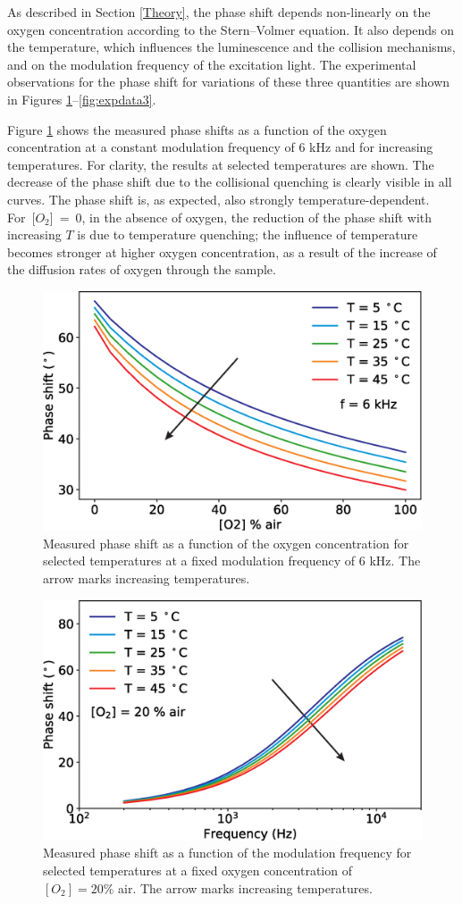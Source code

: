 \documentclass[sensors,article,accept,moreauthors,pdftex,10pt,a4paper]{Definitions/mdpi}
\begin{document}
As described in Section \ref{Theory}, the phase shift depends non-linearly on the oxygen concentration according to the Stern--Volmer equation. It also depends on the temperature, which influences the luminescence and the collision mechanisms, and on the modulation frequency of the excitation light. The experimental observations for the phase shift for variations of these three quantities are shown in Figures \ref{fig:expdata1}--\ref{fig:expdata3}.

Figure \ref{fig:expdata1} shows the measured phase shifts as a function of the oxygen concentration at a constant modulation frequency of 6 kHz and for increasing temperatures. For clarity, the results at selected temperatures are shown. The decrease of the phase shift due to the collisional quenching is clearly visible in all curves. The phase shift is, as expected, also strongly temperature-dependent. \mbox{For [$O_2$] = 0}, in the absence of oxygen, the reduction of the phase shift with increasing $T$ is due to temperature quenching; the influence of temperature becomes stronger at higher oxygen concentration, as a result of the increase of the diffusion rates of oxygen through the sample.

\begin{figure}[H]
\centering
\includegraphics[width=9 cm]{phase_O2_T.eps}
\caption{Measured phase shift as a function of the oxygen concentration for selected temperatures at a fixed modulation frequency of 6 kHz. The arrow marks increasing temperatures.}
\label{fig:expdata1}
\end{figure}
\unskip


\begin{figure}[H]
\centering
\includegraphics[width=9 cm]{phase_f_T.eps}
\caption{Measured phase shift as a function of the modulation frequency for selected temperatures at a fixed oxygen concentration of $[O_2]=20\%$ air. The arrow marks increasing temperatures.}
\label{fig:expdata2}
\end{figure}
\unskip
\end{document}
